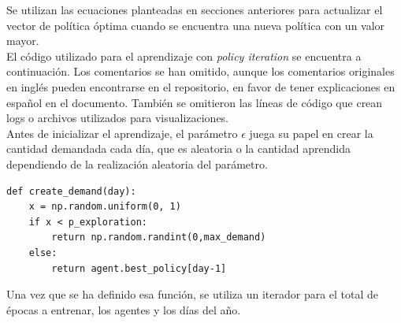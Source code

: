 Se utilizan las ecuaciones planteadas en secciones anteriores para actualizar el vector de pol\'itica \'optima cuando se encuentra una nueva pol\'itica con un valor mayor.\\

El código utilizado para el aprendizaje con \textit{policy iteration} se encuentra a continuaci\'on. Los comentarios se han omitido, aunque los comentarios originales en ingl\'es pueden encontrarse en el repositorio, en favor de tener explicaciones en espa\~nol en el documento. Tambi\'en se omitieron las l\'ineas de c\'odigo que crean logs o archivos utilizados para visualizaciones. \\

Antes de inicializar el aprendizaje, el par\'ametro $\epsilon$ juega su papel en crear la cantidad demandada cada d\'ia, que es aleatoria o la cantidad aprendida dependiendo de la realizaci\'on aleatoria del par\'ametro.

\begin{verbatim}
def create_demand(day):
    x = np.random.uniform(0, 1)
    if x < p_exploration:  
        return np.random.randint(0,max_demand) 
    else: 
        return agent.best_policy[day-1]
\end{verbatim}

Una vez que se ha definido esa funci\'on, se utiliza un iterador para el total de \'epocas a entrenar, los agentes y los d\'ias del a\~no.

